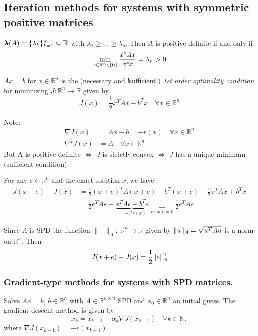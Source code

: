 \documentclass[12pt]{article}
\theoremstyle{definition}
\theoremstyle{remark}
\numberwithin{equation}{section}
\newcommand{\R}{\mathbb{R}}
\newcommand{\N}{\mathbb{N}}
\newcommand{\normempty}{\|\cdot\|}
\newcommand{\spectrum}[1]{\bm{\lambda}(#1)}
\DeclarePairedDelimiter{\norm}{\lVert}{\rVert}
\DeclarePairedDelimiter{\set}{\{}{\}}
\begin{document}
\subsection{Iteration methods for systems with symmetric positive matrices}
$\spectrum{A} = \set{\lambda_k}_{k=1}^n \subseteq \R$ with $\lambda_1 \geq \ldots \geq \lambda_n$. Then $A$ is positive definite if and only if
\begin{equation*}
  \min_{x \in \R^n \setminus \set{0}} \frac{x^*Ax}{x^*x} = \lambda_n > 0
\end{equation*}

$Ax = b$ for $x \in \R^n$ is the (necessary and !sufficient!) \emph{1st order optimality condition} for minimizing $J: \R^n \rightarrow \R$ given by
\begin{equation*}
  J(x) = \frac{1}{2}x^TAx - b^Tx \quad \forall x \in \R^n
\end{equation*}

Note:
\begin{align*}
  \nabla J(x) &= Ax - b = -r(x) \quad \forall x \in \R^n \\
  \nabla^2 J(x) &= A \quad \forall x \in \R^n
\end{align*}
But A is positive definite $\Leftrightarrow$ $J$ is strictly convex $\Leftrightarrow$ $J$ has a unique minimum (sufficient condition).

For any $e \in \R^n$ and the exact solution $x$, we have
\begin{align*}
  J(x+e) - J(x) &= \frac{1}{2}(x+e)^TA(x+e) - b^T(x+e) - \frac{1}{2}x^TAx + b^Tx \\
  &= \frac{1}{2}e^TAe + \underbrace{x^TAe - b^Te}_{=-e^T r(x)} \underbrace{=}_{{r(x) = 0}} \frac{1}{2}e^TAe
\end{align*}

Since $A$ is SPD the function $\normempty_A:\ \R^n \rightarrow \R$ given by $\norm{u}_A = \sqrt{u^TAu}$ is a norm on $\R^n$. Then
\begin{equation*}
  J(x+e) - J(x) = \frac{1}{2} \norm{e}_A^2
\end{equation*}

\subsubsection*{Gradient-type methods for systems with SPD matrices.}

Solve $Ax = b$, $b \in \R^n$ with $A \in \R^{n\times n}$ SPD and $x_0 \in \R^n$ an initial guess. The gradient descent method is given by
\begin{equation*}
  x_k = x_{k-1} - \alpha_k \nabla J(x_{k-1}) \quad \forall k \in \N,
\end{equation*}
where $\nabla J(x_{k-1}) = -r(x_{k-1})$.
\end{document}
